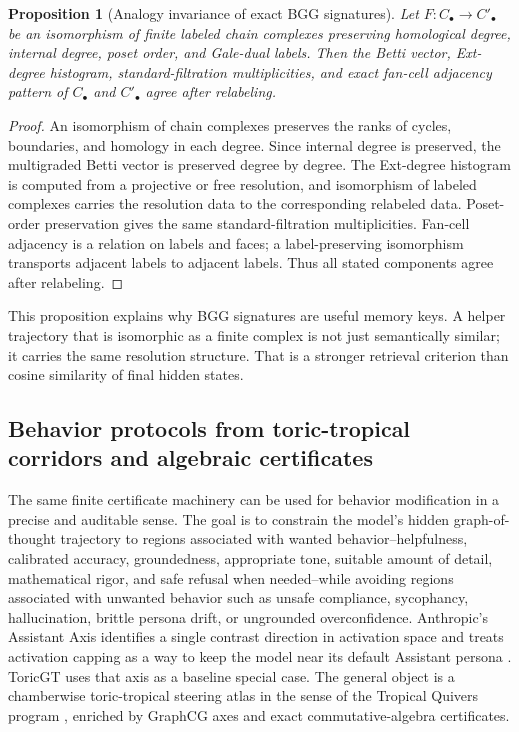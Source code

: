 \documentclass[11pt]{article}
\theoremstyle{definition}
\theoremstyle{plain}
\newtheorem{proposition}[definition]{Proposition}
\theoremstyle{remark}
\numberwithin{equation}{section}
\begin{document}
\begin{proposition}[Analogy invariance of exact BGG signatures]\label{prop:analogy-signature}
Let $F:C_\bullet\to C'_\bullet$ be an isomorphism of finite labeled chain complexes preserving homological degree, internal degree, poset order, and Gale-dual labels.  Then the Betti vector, Ext-degree histogram, standard-filtration multiplicities, and exact fan-cell adjacency pattern of $C_\bullet$ and $C'_\bullet$ agree after relabeling.
\end{proposition}

\begin{proof}
An isomorphism of chain complexes preserves the ranks of cycles, boundaries, and homology in each degree.  Since internal degree is preserved, the multigraded Betti vector is preserved degree by degree.  The Ext-degree histogram is computed from a projective or free resolution, and isomorphism of labeled complexes carries the resolution data to the corresponding relabeled data.  Poset-order preservation gives the same standard-filtration multiplicities.  Fan-cell adjacency is a relation on labels and faces; a label-preserving isomorphism transports adjacent labels to adjacent labels.  Thus all stated components agree after relabeling.
\end{proof}

This proposition explains why BGG signatures are useful memory keys.  A helper trajectory that is isomorphic as a finite complex is not just semantically similar; it carries the same resolution structure.  That is a stronger retrieval criterion than cosine similarity of final hidden states.

\subsection{Behavior protocols from toric-tropical corridors and algebraic certificates}
\label{subsec:behavior-corridors-bgg}

The same finite certificate machinery can be used for behavior modification in a precise and auditable sense.  The goal is to constrain the model's hidden graph-of-thought trajectory to regions associated with wanted behavior--helpfulness, calibrated accuracy, groundedness, appropriate tone, suitable amount of detail, mathematical rigor, and safe refusal when needed--while avoiding regions associated with unwanted behavior such as unsafe compliance, sycophancy, hallucination, brittle persona drift, or ungrounded overconfidence.  Anthropic's Assistant Axis identifies a single contrast direction in activation space and treats activation capping as a way to keep the model near its default Assistant persona \cite{lu2026assistantaxis}.  ToricGT uses that axis as a baseline special case.  The general object is a chamberwise toric-tropical steering atlas in the sense of the Tropical Quivers program \cite{schreiber2026tropicalquivers}, enriched by GraphCG axes and exact commutative-algebra certificates.
\end{document}
